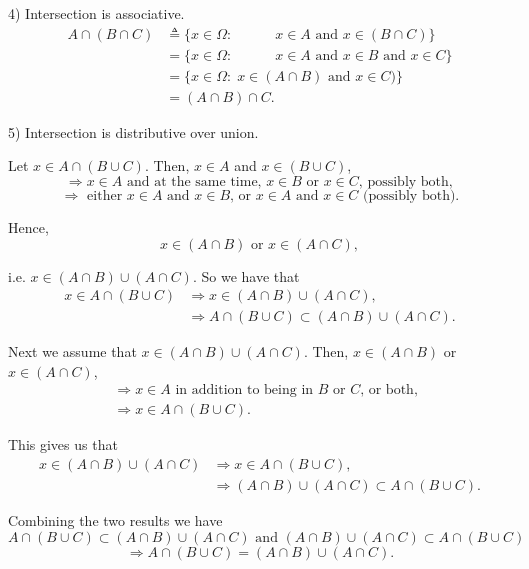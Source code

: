 \documentclass[12pt,thmsa]{article}
\begin{document}
\medskip

4) Intersection is associative.
\[
\begin{aligned}
	A \cap(B \cap C) &\triangleq \{x \in \Omega: \qquad \quad x \in A \text { and } x \in(B \cap C)\} \\
	&=\{x \in \Omega: \qquad \quad x \in A \text { and } x \in B \text { and } x \in C\} \\
	&=\{x \in \Omega: \; x \in(A \cap B) \text{  and } x \in C)\} \\
	&=(A \cap B) \cap C.
\end{aligned}
\]

\medskip

5) Intersection is distributive over union.

Let \(x \in A \cap(B \cup C) \). Then, \(x \in A\) and \(x \in(B \cup C)\), 
\[ \Rightarrow x \in A \text{ and at the same time, } x \in B \text{ or } x \in C \text{, possibly both}, \] \[\Rightarrow \text{ either } x \in A \text{ and } x \in B \text{, or } x \in A  \text{ and } x \in C \text{ (possibly both).} \]

Hence, \[x \in(A \cap B) \text{ or } x \in(A \cap C),\]   

i.e. \(x \in(A \cap B) \cup(A \cap C)\). So we have that \[
\begin{aligned}
x \in A \cap(B \cup C) & \Rightarrow x \in(A \cap B) \cup(A \cap C), \\
&\Rightarrow A \cap(B \cup C) \subset(A \cap B) \cup(A \cap C).
\end{aligned}\]   

Next we assume that \(x \in(A \cap B) \cup(A \cap C) \). Then, \(x \in(A \cap B)\) or \(x \in(A \cap C)\), 
\[ \begin{aligned} &\Rightarrow x \in A \text{ in addition to being in } B \text{ or } C \text{, or both,} \\
	&\Rightarrow x \in A \cap(B \cup C). \end{aligned}\]    

This gives us that \[\begin{aligned}
x \in(A \cap B) \cup(A \cap C) &\Rightarrow x \in A \cap(B \cup C),\\
&\Rightarrow (A \cap B) \cup(A \cap C) \subset A \cap(B \cup C).
\end{aligned}\]    

Combining the two results we have
\[A \cap(B \cup C) \subset(A \cap B) \cup(A \cap C) \text{ and } (A \cap B) \cup(A \cap C) \subset A \cap(B \cup C) \]
\[\Rightarrow A \cap(B \cup C)=(A \cap B) \cup(A \cap C).\]
\end{document}
